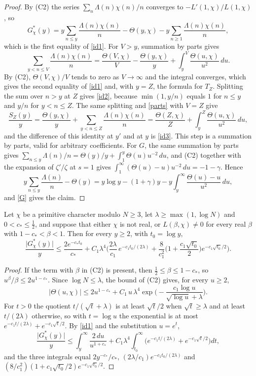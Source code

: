 \begin{proof}
By (C2) the series $\sum_n\Lambda(n)\chi(n)/n$ converges to $-L'(1,\chi)/L(1,\chi)$, so
\[
G^\ast_\chi(y)=y\sum_{n\le y}\frac{\Lambda(n)\chi(n)}n-\Theta(y,\chi)-y\sum_{n\ge1}\frac{\Lambda(n)\chi(n)}n ,
\]
which is the first equality of \eqref{id1}. For $V>y$, summation by parts gives
\begin{equation}\label{parts}
\sum_{y<n\le V}\frac{\Lambda(n)\chi(n)}n=\frac{\Theta(V,\chi)}V-\frac{\Theta(y,\chi)}y+\int_y^V\frac{\Theta(u,\chi)}{u^2}\,du .
\end{equation}
By (C2), $\Theta(V,\chi)/V$ tends to zero as $V\to\infty$ and the integral converges, which gives the second equality of \eqref{id1} and, with $y=Z$, the formula for $T_Z$. Splitting the sum over $n>y$ at $Z$ gives \eqref{id2}, because $\min(1,y/n)$ equals $1$ for $n\le y$ and $y/n$ for $y<n\le Z$. The same splitting and \eqref{parts} with $V=Z$ give
\[
\frac{S_Z(y)}y=\frac{\Theta(y,\chi)}y+\sum_{y<n\le Z}\frac{\Lambda(n)\chi(n)}n=\frac{\Theta(Z,\chi)}Z+\int_y^Z\frac{\Theta(u,\chi)}{u^2}\,du ,
\]
and the difference of this identity at $y'$ and at $y$ is \eqref{id3}. This step is a summation by parts, valid for arbitrary coefficients. For $G$, the same summation by parts gives $\sum_{n\le y}\Lambda(n)/n=\Theta(y)/y+\int_1^y\Theta(u)u^{-2}\,du$, and (C2) together with the expansion of $\zeta'/\zeta$ at $s=1$ gives $\int_1^\infty(\Theta(u)-u)u^{-2}\,du=-1-\gamma$. Hence
\[
y\sum_{n\le y}\frac{\Lambda(n)}n-\Theta(y)=y\log y-(1+\gamma)y-y\int_y^\infty\frac{\Theta(u)-u}{u^2}\,du ,
\]
and \eqref{G} gives the claim.
\end{proof}

\begin{proposition}\label{thinprop}
Let $\chi$ be a primitive character modulo $N\ge3$, let $\lambda\ge\max(1,\log N)$ and $0<c_\ast\le\frac12$, and suppose that either $\chi$ is not real, or $L(\beta,\chi)\ne0$ for every real $\beta$ with $1-c_\ast<\beta<1$. Then for every $y\ge2$, with $t_0=\log y$,
\[
\frac{\lvert G^\ast_\chi(y)\rvert}{y}\le\frac{2e^{-c_\ast t_0}}{c_\ast}+C_1\lambda^4\Big(\frac{2\lambda}{c_1}\,e^{-c_1t_0/(2\lambda)}+\frac8{c_1^2}\Big(1+\frac{c_1\sqrt{t_0}}2\Big)e^{-c_1\sqrt{t_0}/2}\Big).
\]
\end{proposition}

\begin{proof}
If the term with $\beta$ in (C2) is present, then $\frac12\le\beta\le1-c_\ast$, so $u^\beta/\beta\le2u^{1-c_\ast}$. Since $\log N\le\lambda$, the bound of (C2) gives, for every $u\ge2$,
\[
\lvert\Theta(u,\chi)\rvert\le2u^{1-c_\ast}+C_1\,u\,\lambda^4\exp\Big(-\frac{c_1\log u}{\sqrt{\log u}+\lambda}\Big).
\]
For $t>0$ the quotient $t/(\sqrt t+\lambda)$ is at least $\sqrt t/2$ when $\sqrt t\ge\lambda$ and at least $t/(2\lambda)$ otherwise, so with $t=\log u$ the exponential is at most $e^{-c_1t/(2\lambda)}+e^{-c_1\sqrt t/2}$. By \eqref{id1} and the substitution $u=e^t$,
\[
\frac{\lvert G^\ast_\chi(y)\rvert}y\le\int_y^\infty\frac{2\,du}{u^{1+c_\ast}}+C_1\lambda^4\int_{t_0}^\infty\Big(e^{-c_1t/(2\lambda)}+e^{-c_1\sqrt t/2}\Big)dt ,
\]
and the three integrals equal $2y^{-c_\ast}/c_\ast$, $(2\lambda/c_1)e^{-c_1t_0/(2\lambda)}$ and $(8/c_1^2)(1+c_1\sqrt{t_0}/2)e^{-c_1\sqrt{t_0}/2}$.
\end{proof}

